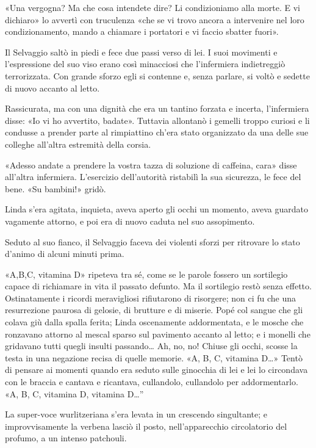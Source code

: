 \documentclass[
a5paper, %
10pt, %
twoside, 
onecolumn, %
openany, %
]{memoir}
\begin{document}
«Una vergogna? Ma che cosa intendete dire? Li condizioniamo alla morte. E vi dichiaro» lo avvertì con truculenza «che se vi trovo ancora a intervenire nel loro condizionamento, mando a chiamare i portatori e vi faccio sbatter fuori».

Il Selvaggio saltò in piedi e fece due passi verso di lei. I suoi movimenti e l’espressione del suo viso erano così minacciosi che l’infermiera indietreggiò terrorizzata. Con grande sforzo egli si contenne e, senza parlare, si voltò e sedette di nuovo accanto al letto.

Rassicurata, ma con una dignità che era un tantino forzata e incerta, l’infermiera disse: «Io vi ho avvertito, badate». Tuttavia allontanò i gemelli troppo curiosi e li condusse a prender parte al rimpiattino ch’era stato organizzato da una delle sue colleghe all’altra estremità della corsia.

«Adesso andate a prendere la vostra tazza di soluzione di caffeina, cara» disse all’altra infermiera. L’esercizio dell’autorità ristabilì la sua sicurezza, le fece del bene. «Su bambini!» gridò.

Linda s’era agitata, inquieta, aveva aperto gli occhi un momento, aveva guardato vagamente attorno, e poi era di nuovo caduta nel suo assopimento.

Seduto al suo fianco, il Selvaggio faceva dei violenti sforzi per ritrovare lo stato d’animo di alcuni minuti prima.

«A,B,C, vitamina D» ripeteva tra sé, come se le parole fossero un sortilegio capace di richiamare in vita il passato defunto. Ma il sortilegio restò senza effetto. Ostinatamente i ricordi meravigliosi rifiutarono di risorgere; non ci fu che una resurrezione paurosa di gelosie, di brutture e di miserie. Popé col sangue che gli colava giù dalla spalla ferita; Linda oscenamente addormentata, e le mosche che ronzavano attorno al mescal sparso sul pavimento accanto al letto; e i monelli che gridavano tutti quegli insulti passando… Ah, no, no! Chiuse gli occhi, scosse la testa in una negazione recisa di quelle memorie. «A, B, C, vitamina D…» Tentò di pensare ai momenti quando era seduto sulle ginocchia di lei e lei lo circondava con le braccia e cantava e ricantava, cullandolo, cullandolo per addormentarlo. «A, B, C, vitamina D, vitamina D…”

La super-voce wurlitzeriana s’era levata in un crescendo singultante; e improvvisamente la verbena lasciò il posto, nell’apparecchio circolatorio del profumo, a un intenso patchouli.
\end{document}
